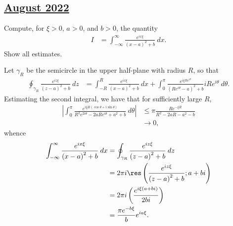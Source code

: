 \documentclass[10pt]{mypackage}
\begin{document}
\subsection{\href{https://math.virginia.edu/graduate/exams/analysis/2022Aug_complex.html}{August 2022}}%
\begin{problem}[Problem 1]
  Compute, for $\xi > 0$, $a > 0$, and $b > 0$, the quantity
  \begin{align*}
    I &= \int_{-\infty}^{\infty} \frac{e^{ix\xi}}{\left( x-a \right)^2 + b}\:dx.
  \end{align*}
  Show all estimates.
\end{problem}
\begin{solution}
  Let $\gamma_R$ be the semicircle in the upper half-plane with radius $R$, so that
  \begin{align*}
    \oint_{\gamma_R}^{} \frac{e^{iz\xi}}{\left( z-a \right)^2 + b}\:dz &= \int_{-R}^{R} \frac{e^{ix\xi}}{\left( x-a \right)^2 + b}\:dx + \int_{0}^{\pi} \frac{e^{i\xi Re^{i\theta}}}{\left( Re^{i\theta}-a \right)^2 + b}iRe^{i\theta}\:d\theta.
  \end{align*}
  Estimating the second integral, we have that for sufficiently large $R$,
  \begin{align*}
    \left\vert \int_{0}^{\pi} \frac{e^{i\xi R\left( \cos\theta + i\sin\theta \right)}}{R^2e^{2i\theta}-2aRe^{i\theta} + a^2 + b}\:d\theta \right\vert &\leq \pi \frac{Re^{-\xi R}}{R^2-2aR-a^2-b}\\
                                                                                                                                                            &\rightarrow 0,
  \end{align*}
  whence
  \begin{align*}
    \int_{-\infty}^{\infty} \frac{e^{ix\xi}}{\left( x-a \right)^2 + b}\:dx &= \oint_{\gamma_R}^{} \frac{e^{iz\xi}}{\left( z-a \right)^2 + b}\:dz\\
                                                                           &= 2\pi i \res\left( \frac{e^{iz\xi}}{\left( z-a \right)^2 + b}; a+bi \right)\\
                                                                           &= 2\pi i \left( \frac{e^{i\xi\left( a + bi \right)}}{2bi} \right)\\
                                                                           &= \frac{\pi e^{-b\xi}}{b}e^{ia\xi}.
  \end{align*}
\end{solution}
\end{document}
